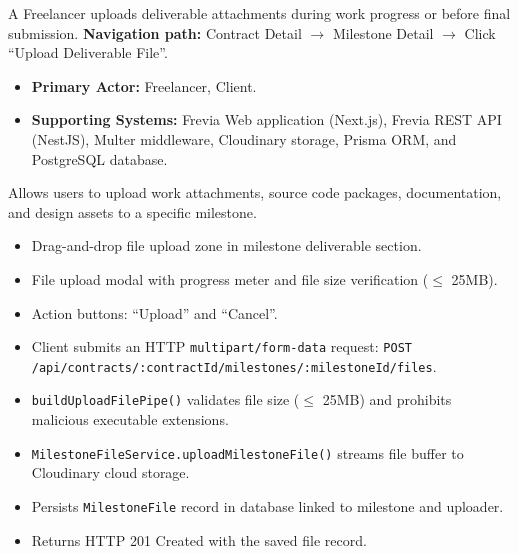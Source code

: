 A Freelancer uploads deliverable attachments during work progress or before final submission.\newline
\textbf{Navigation path:} Contract Detail $\rightarrow$ Milestone Detail $\rightarrow$ Click ``Upload Deliverable File''.


\begin{itemize}[leftmargin=1.6em,topsep=3pt,itemsep=2pt,parsep=0pt,label=$\bullet$]
      \item \textbf{Primary Actor:} Freelancer, Client.
      \item \textbf{Supporting Systems:} Frevia Web application (Next.js), Frevia REST API (NestJS), Multer middleware, Cloudinary storage, Prisma ORM, and PostgreSQL database.
\end{itemize}

\noindent Allows users to upload work attachments, source code packages, documentation, and design assets to a specific milestone.

\begin{itemize}[leftmargin=1.6em,topsep=3pt,itemsep=2pt,parsep=0pt,label=$\bullet$]
      \item Drag-and-drop file upload zone in milestone deliverable section.
      \item File upload modal with progress meter and file size verification ($\le$ 25MB).
      \item Action buttons: ``Upload'' and ``Cancel''.
\end{itemize}

\begin{itemize}[leftmargin=1.6em,topsep=3pt,itemsep=2pt,parsep=0pt,label=$\bullet$]
      \item Client submits an HTTP \texttt{multipart/\allowbreak{}form-\allowbreak{}data} request: \texttt{POST /\allowbreak{}api/\allowbreak{}contracts/\allowbreak{}:\allowbreak{}contractId/\allowbreak{}milestones/\allowbreak{}:\allowbreak{}milestoneId/\allowbreak{}files}.
      \item \texttt{build\allowbreak{}Upload\allowbreak{}File\allowbreak{}Pipe()} validates file size ($\le$ 25MB) and prohibits malicious executable extensions.
      \item \texttt{Milestone\allowbreak{}File\allowbreak{}Service.\allowbreak{}upload\allowbreak{}Milestone\allowbreak{}File()} streams file buffer to Cloudinary cloud storage.
      \item Persists \texttt{MilestoneFile} record in database linked to milestone and uploader.
      \item Returns HTTP 201 Created with the saved file record.
\end{itemize}

